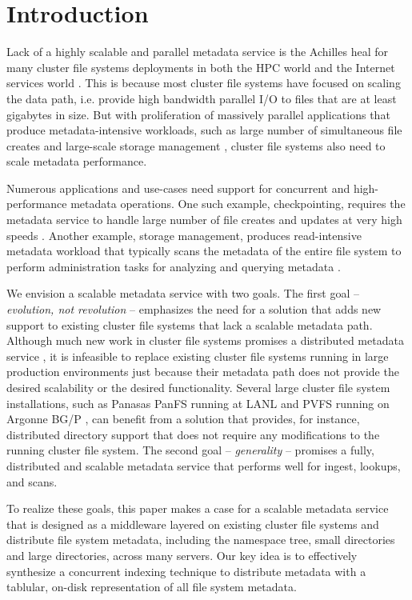 \section{Introduction}

Lack of a highly scalable and parallel metadata service is the 
Achilles heal for many cluster file systems deployments in both the HPC world 
and the Internet services world \citep{hecfsio:tr06, hpcs-io:2008}.
This is because most cluster file systems have focused on scaling the
data path, i.e. provide high bandwidth parallel I/O to files that are 
at least gigabytes in size.
But with proliferation of massively parallel applications that produce 
metadata-intensive workloads, such as large number of simultaneous file creates
\cite{PLFS} and large-scale storage management \cite{ssdm}, cluster file systems 
also need to scale metadata performance.

Numerous applications and use-cases need support for concurrent and 
high-performance metadata operations.
One such example, checkpointing, requires the metadata service to
handle large number of file creates and updates at very high speeds 
\cite{PLFS}.
Another example, storage management, produces read-intensive metadata workload
that typically scans the metadata of the entire file system to perform
administration tasks for analyzing and querying metadata \cite{issdm}.

We envision a scalable metadata service with two goals. 
The first goal -- \textit{evolution, not revolution} -- emphasizes the need for
a solution that adds new support to existing cluster file systems that lack a 
scalable metadata path.
Although much new work in cluster file systems promises a distributed
metadata service \cite{ceph:weil06, 50mfiles-in-googlefs:fikes10}, it is
infeasible to replace existing cluster file systems running in large production
environments just because their metadata path does not provide the desired
scalability or the desired functionality.
Several large cluster file system installations, such as Panasas PanFS running
at LANL \cite{cielo} and PVFS running on Argonne BG/P 
\cite{pvfs:www,bgp}, can 
benefit from a solution that provides, for instance, distributed directory support 
that does not require any modifications to the running cluster file system.
The second goal -- \textit{generality} -- promises a fully, distributed and
scalable metadata service that performs well for ingest, lookups, and scans.
 
To realize these goals, this paper makes a case for a scalable metadata service 
that is designed as a middleware layered on existing cluster file systems and 
distribute file system metadata, including the namespace tree, small 
directories and large directories, across many servers.
Our key idea is to effectively synthesize a concurrent indexing 
technique to distribute metadata with a tablular, on-disk representation of all
file system metadata. 


